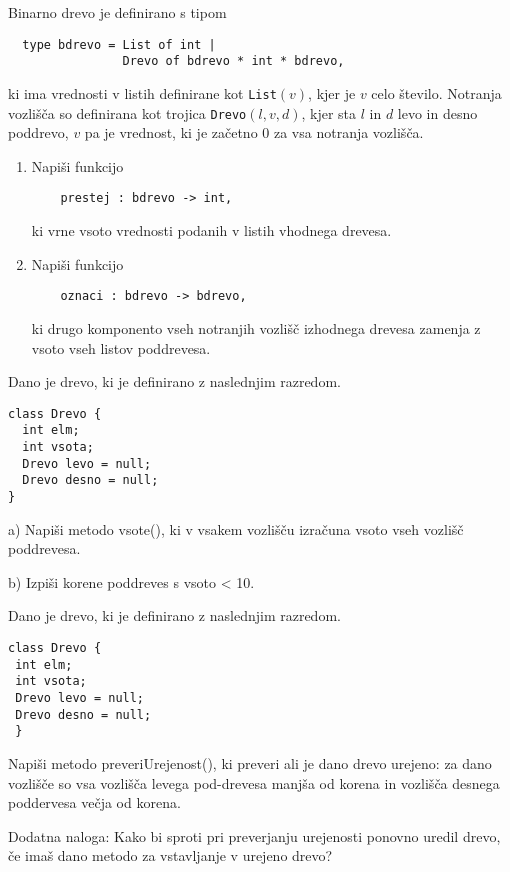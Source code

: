 \begin{ex}
  Binarno drevo je definirano s tipom
\begin{lstlisting}
  type bdrevo = List of int |
                Drevo of bdrevo * int * bdrevo,
\end{lstlisting}
  ki ima vrednosti v listih definirane kot \lstinline{List}$(v)$, kjer je
  $v$ celo \v stevilo.  Notranja vozli\v s\v ca so definirana kot
  trojica \lstinline{Drevo}$(l, v, d)$, kjer sta $l$ in $d$ levo in desno
  poddrevo, $v$ pa je vrednost, ki je za\v cetno $0$ za vsa notranja
  vozli\v s\v ca.

  \begin{enumerate}[label=(\roman*)]
  \item Napi\v si funkcijo
\begin{lstlisting}
    prestej : bdrevo -> int, 
\end{lstlisting}
    ki vrne vsoto vrednosti podanih v listih vhodnega drevesa.

  \item Napi\v si funkcijo
\begin{lstlisting}
    oznaci : bdrevo -> bdrevo,
\end{lstlisting}
    ki drugo komponento vseh notranjih vozli\v s\v c izhodnega drevesa
    zamenja z vsoto vseh listov poddrevesa.
  \end{enumerate}


\end{ex} 
\begin{ex}
Dano je drevo, ki je definirano z naslednjim razredom.

\begin{lstlisting}
class Drevo {
  int elm;
  int vsota;
  Drevo levo = null;
  Drevo desno = null;
}
\end{lstlisting}

a) Napi\v si metodo vsote(), ki v vsakem vozli\v s\v cu izra\v cuna vsoto vseh vozli\v s\v c poddrevesa.

b) Izpi\v si korene poddreves s vsoto < 10.



\end{ex}
\begin{ex}
Dano je drevo, ki je definirano z naslednjim razredom.

\begin{lstlisting}
class Drevo {
 int elm;
 int vsota;
 Drevo levo = null;
 Drevo desno = null;
 }
\end{lstlisting}

Napi\v si metodo preveriUrejenost(), ki preveri ali je dano drevo urejeno: za dano vozli\v s\v ce so vsa vozli\v s\v ca levega pod-drevesa manj\v sa od korena in vozli\v s\v ca desnega poddervesa ve\v cja od korena. 

Dodatna naloga: Kako bi sproti pri preverjanju urejenosti ponovno uredil drevo, \v ce ima\v s dano metodo za vstavljanje v urejeno drevo?
\end{ex}
